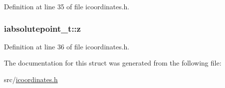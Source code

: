 Definition at line 35 of file icoordinates.\-h.

\hypertarget{structiabsolutepoint__t_a106b4f66e6ffbfcaa4f8c7fc428cc8d0}{
\subsubsection[{z}]{ iabsolutepoint\-\_\-t\-::z}}\label{structiabsolutepoint__t_a106b4f66e6ffbfcaa4f8c7fc428cc8d0}


Definition at line 36 of file icoordinates.\-h.



The documentation for this struct was generated from the following file\-:\begin{DoxyCompactItemize}
\item 
src/\hyperlink{icoordinates_8h}{icoordinates.\-h}\end{DoxyCompactItemize}
